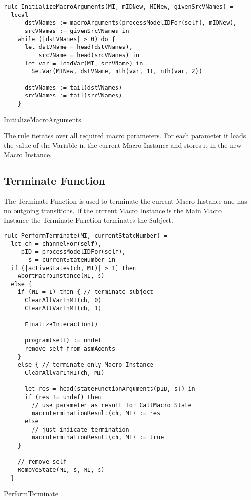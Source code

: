 \begin{listing}[htbp]
\begin{verbatim}
rule InitializeMacroArguments(MI, mIDNew, MINew, givenSrcVNames) =
  local
      dstVNames := macroArguments(processModelIDFor(self), mIDNew),
      srcVNames := givenSrcVNames in
    while (|dstVNames| > 0) do {
      let dstVName = head(dstVNames),
          srcVName = head(srcVNames) in
      let var = loadVar(MI, srcVName) in
        SetVar(MINew, dstVName, nth(var, 1), nth(var, 2))

      dstVNames := tail(dstVNames)
      srcVNames := tail(srcVNames)
    }
\end{verbatim}
\caption{InitializeMacroArguments}
\label{lst:shortasm:InitializeMacroArguments}
\end{listing}


The  rule iterates over all required macro parameters. For each parameter it loads the value of the Variable in the current Macro Instance and stores it in the new Macro Instance.


\subsection{Terminate Function}

The Terminate Function is used to terminate the current Macro Instance and has no outgoing transitions. If the current Macro Instance is the Main Macro Instance the Terminate Function terminates the Subject.


\begin{listing}[htbp]
\begin{verbatim}
rule PerformTerminate(MI, currentStateNumber) =
  let ch = channelFor(self),
     pID = processModelIDFor(self),
       s = currentStateNumber in
  if (|activeStates(ch, MI)| > 1) then
    AbortMacroInstance(MI, s)
  else {
    if (MI = 1) then { // terminate subject
      ClearAllVarInMI(ch, 0)
      ClearAllVarInMI(ch, 1)

      FinalizeInteraction()

      program(self) := undef
      remove self from asmAgents
    }
    else { // terminate only Macro Instance
      ClearAllVarInMI(ch, MI)

      let res = head(stateFunctionArguments(pID, s)) in
      if (res != undef) then
        // use parameter as result for CallMacro State
        macroTerminationResult(ch, MI) := res
      else
        // just indicate termination
        macroTerminationResult(ch, MI) := true
    }

    // remove self
    RemoveState(MI, s, MI, s)
  }
\end{verbatim}
\caption{PerformTerminate}
\label{lst:shortasm:PerformTerminate}
\end{listing}


